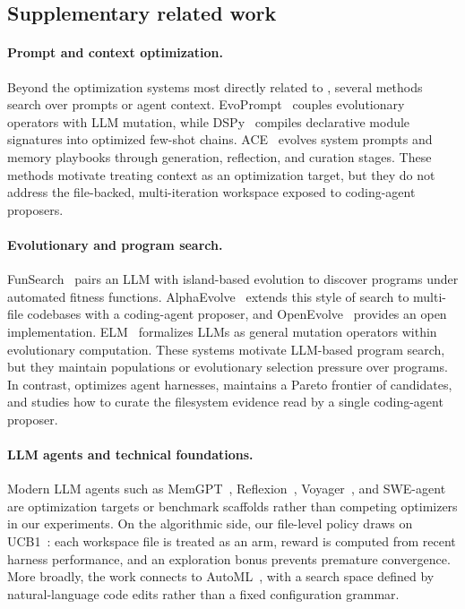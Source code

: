 \subsection{Supplementary related work}
\label{app:supp_related}

\paragraph{Prompt and context optimization.}
Beyond the optimization systems most directly related to \name, several
methods search over prompts or agent context. EvoPrompt~\cite{guo2024evoprompt}
couples evolutionary operators with LLM mutation, while
DSPy~\cite{khattab2023dspy} compiles declarative module signatures into
optimized few-shot chains. ACE~\cite{zhang2025ace} evolves system prompts and
memory playbooks through generation, reflection, and curation stages. These
methods motivate treating context as an optimization target, but they do not
address the file-backed, multi-iteration workspace exposed to coding-agent
proposers.

\paragraph{Evolutionary and program search.}
FunSearch~\cite{romeraparedes2024funsearch} pairs an LLM with island-based
evolution to discover programs under automated fitness functions.
AlphaEvolve~\cite{novikov2025alphaevolve} extends this style of search to
multi-file codebases with a coding-agent proposer, and
OpenEvolve~\cite{sharma2025openevolve} provides an open implementation.
ELM~\cite{lehman2023elm} formalizes LLMs as general mutation operators within
evolutionary computation. These systems motivate LLM-based program search, but
they maintain populations or evolutionary selection pressure over programs. In
contrast, \name optimizes agent harnesses, maintains a Pareto frontier of
candidates, and studies how to curate the filesystem evidence read by a single
coding-agent proposer.

\paragraph{LLM agents and technical foundations.}
Modern LLM agents such as MemGPT~\cite{packer2023memgpt},
Reflexion~\cite{shinn2023reflexion}, Voyager~\cite{wang2023voyager}, and
SWE-agent~\cite{yang2024sweagent} are optimization targets or benchmark
scaffolds rather than competing optimizers in our experiments. On the
algorithmic side, our file-level policy draws on UCB1~\cite{auer2002ucb}: each
workspace file is treated as an arm, reward is computed from recent harness
performance, and an exploration bonus prevents premature convergence.
More broadly, the work connects to AutoML~\cite{he2021automl}, with a search
space defined by natural-language code edits rather than a fixed
configuration grammar.
